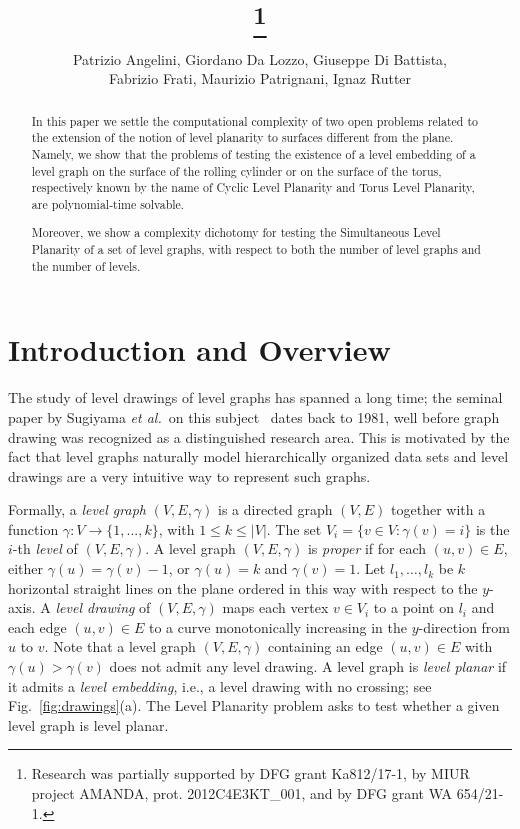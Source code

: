 \documentclass{llncs}
\title{\try\thanks{Research was partially supported by DFG grant Ka812/17-1, by MIUR project AMANDA, prot. 2012C4E3KT\_001, and by DFG grant WA 654/21-1.}
}
\author{Patrizio {Angelini\tuba}, Giordano {Da Lozzo\rome}, Giuseppe {Di Battista\rome}, \\
    Fabrizio {Frati\rome}, Maurizio {Patrignani\rome}, Ignaz {Rutter\kit}
	\institute{
    \tuba T\"ubingen University, Germany --
    \email{angelini@informatik.uni-tuebingen.de}\\
	\rome~Roma Tre University, Italy --
    \email{\{dalozzo,gdb,frati,patrigna\}@dia.uniroma3.it}\\
    \kit~Karlsruhe Institute of Technology, Germany -- 
    \email{rutter@kit.edu}
}}
\begin{document}
\maketitle
\pagestyle{plain}

\begin{abstract}
In this paper we settle the computational complexity of two open problems related to the extension of the notion of level planarity to surfaces different from the plane. Namely, we show that the problems of testing the existence of a level embedding of a level graph on the surface of the rolling cylinder or on the surface of the torus, respectively known by the name of {\sc Cyclic Level Planarity} and {\sc Torus Level Planarity}, are polynomial-time solvable. 
 
Moreover, we show a complexity dichotomy for testing the {\sc Simultaneous Level Planarity} of a set of level graphs, with respect to both the number of level graphs and the number of levels.
\end{abstract}



\section{Introduction and Overview} \label{se:intro}


The study of level drawings of level graphs has spanned a long time; the seminal paper by Sugiyama {\em et al.}~on this subject~\cite{stt-mvuhs-81} dates back to 1981, well before graph drawing was recognized as a distinguished research area. This is motivated by the fact that level graphs naturally model hierarchically organized data sets and level drawings are a very intuitive way to represent such graphs.

Formally, a \emph{level graph} $(V,E,\gamma)$ is a directed graph $(V,E)$ together with a function $\gamma: V \rightarrow \{1,...,k\}$, with $1 \leq k \leq |V|$. The set $V_i = \{ v \in V \colon \gamma(v)=i\}$ is the $i$-th \emph{level} of $(V,E,\gamma)$.  
A level graph $(V,E,\gamma)$ is \emph{proper} if for each $(u,v) \in E$, either $\gamma(u) = \gamma(v) - 1$, or $\gamma(u)=k$ and $\gamma(v)=1$. Let $l_1,\dots,l_k$ be $k$ horizontal straight lines on the plane ordered in this way with respect to the $y$-axis. A \emph{level drawing} of $(V,E,\gamma)$ maps each vertex $v\in V_i$ to a point on $l_i$ and each edge $(u,v)\in E$ to a curve monotonically increasing in the $y$-direction from $u$ to $v$. Note that a level graph $(V,E,\gamma)$ containing an edge $(u,v)\in E$ with $\gamma(u)>\gamma(v)$ does not admit any level drawing. A level graph is \emph{level planar} if it admits a {\em level embedding}, i.e., a level drawing with no crossing; see Fig.~\ref{fig:drawings}(a). The {\sc Level Planarity} problem asks to test whether a given level graph is level planar.
 
\end{document}

